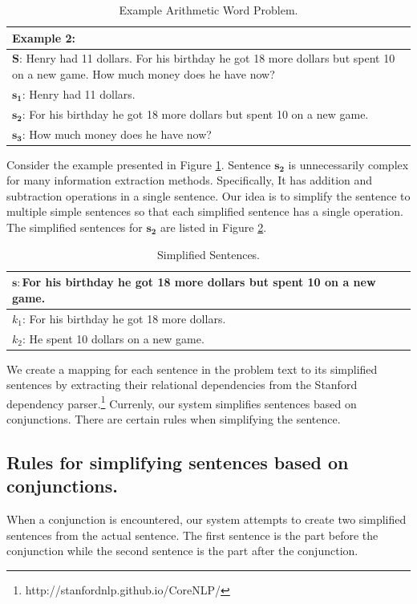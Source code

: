 \documentclass[11pt]{article}
\begin{document}
\begin{table}[h!]
\centering
\begin{tabular}{ | m{25em} | }
\hline
\textbf{Example 2:}\\
\hline
$\mathbf{S}$: Henry had 11 dollars. For his birthday he got 18 more dollars but spent 10 on a new game. How much money does he have now?\\
\hline
$\mathbf{s_{1}}$: Henry had 11 dollars.\\
\hline
$\mathbf{s_{2}}$: For his birthday he got 18 more dollars but spent 10 on a new game.\\
\hline
$\mathbf{s_{3}}$: How much money does he have now?\\
\hline
\end{tabular}
\caption{Example Arithmetic Word Problem.}
\label{figure:6}
\end{table}

Consider the example presented in Figure \ref{figure:6}. Sentence $\mathbf{s_{2}}$ is unnecessarily complex for many information extraction methods. Specifically, It has addition and subtraction operations in a single sentence. Our idea is to simplify the sentence to multiple simple sentences so that each simplified sentence has a single operation. The simplified sentences for $\mathbf{s_{2}}$ are listed in Figure \ref{figure:7}.

\begin{table}[h!]
\centering
\begin{tabular}{ | m{25em} | }
\hline
 $\mathbf{s}:$\textbf{For his birthday he got 18 more dollars but spent 10 on a new game.}\\
\hline
 $\mathit{k_{1}}$: For his birthday he got 18 more dollars.\\
\hline
$\mathit{k_{2}}$: He spent 10 dollars on a new game.\\
\hline
\end{tabular}
\caption{Simplified Sentences.}
\label{figure:7}
\end{table}

We create a mapping for each sentence in the problem text to its simplified sentences by extracting their relational dependencies from the Stanford dependency parser.\footnote{http://stanfordnlp.github.io/CoreNLP/ } Currenly, our system simplifies sentences based on conjunctions. There are certain rules when simplifying the sentence.

\subsection{Rules for simplifying sentences based on conjunctions.}\label{sec:simplifyingrules}
 When a conjunction is encountered, our system attempts to create two simplified sentences from the actual sentence. The first sentence is the part before the conjunction while the second sentence is the part after the conjunction.
\end{document}
